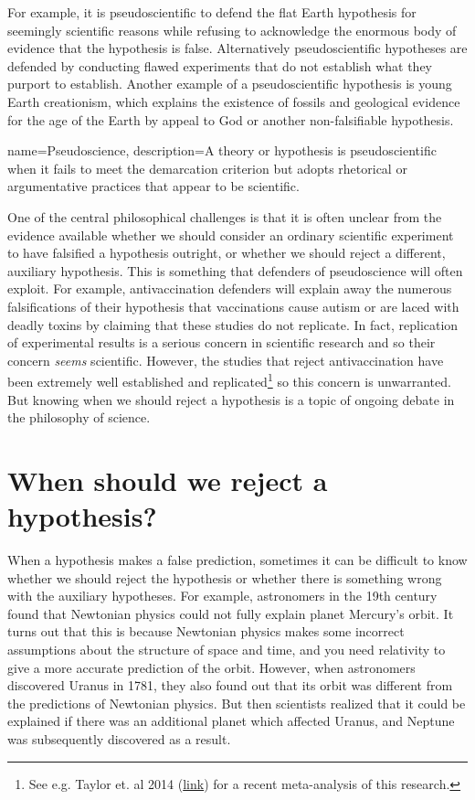 For example, it is pseudoscientific to defend the flat Earth hypothesis for seemingly scientific reasons while refusing to acknowledge the enormous body of evidence that the hypothesis is false. Alternatively pseudoscientific hypotheses are defended by conducting flawed experiments that do not establish what they purport to establish. Another example of a pseudoscientific hypothesis is young Earth creationism, which explains the existence of fossils and geological evidence for the age of the Earth by appeal to God or another non-falsifiable hypothesis. 

{
name=Pseudoscience,
description={A theory or hypothesis is pseudoscientific when it fails to meet the demarcation criterion but adopts rhetorical or argumentative practices that appear to be scientific.}
}

One of the central philosophical challenges is that it is often unclear from the evidence available whether we should consider an ordinary scientific experiment to have falsified a hypothesis outright, or whether we should reject a different, auxiliary hypothesis. This is something that defenders of pseudoscience will often exploit. For example, antivaccination defenders will explain away the numerous falsifications of their hypothesis that vaccinations cause autism or are laced with deadly toxins by claiming that these studies do not replicate. In fact, replication of experimental results is a serious concern in scientific research and so their concern \emph{seems} scientific. However, the studies that reject antivaccination have been extremely well established and replicated\footnote{See e.g. Taylor et. al 2014 (\href{https://www.ncbi.nlm.nih.gov/pubmed/24814559}{link}) for a recent meta-analysis of this research.} so this concern is unwarranted. But knowing when we should reject a hypothesis is a topic of ongoing debate in the philosophy of science.

\section{When should we reject a hypothesis?}

When a hypothesis makes a false prediction, sometimes it can be difficult to know whether we should reject the hypothesis or whether there is something wrong with the auxiliary hypotheses. For example, astronomers in the 19th century found that Newtonian physics could not fully explain planet Mercury's orbit. It turns out that this is because Newtonian physics makes some incorrect assumptions about the structure of space and time, and you need relativity to give a more accurate prediction of the orbit. However, when astronomers discovered Uranus in 1781, they also found out that its orbit was different from the predictions of Newtonian physics. But then scientists realized that it could be explained if there was an additional planet which affected Uranus, and Neptune was subsequently discovered as a result.

